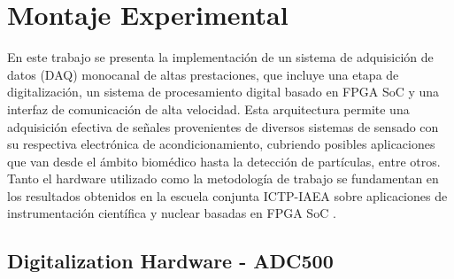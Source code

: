 \documentclass[]{book}
\begin{document}



\section{Montaje Experimental}

\noindent En este trabajo se presenta la implementación de un sistema de adquisición de datos (DAQ) monocanal de altas prestaciones, que incluye una etapa de digitalización, un sistema de procesamiento digital basado en FPGA SoC y una interfaz de comunicación de alta velocidad. Esta arquitectura permite una adquisición efectiva de señales provenientes de diversos sistemas de sensado con su respectiva electrónica de acondicionamiento, cubriendo posibles aplicaciones que van desde el ámbito biomédico hasta la detección de partículas, entre otros. Tanto el hardware utilizado como la metodología de trabajo se fundamentan en los resultados obtenidos en la escuela conjunta ICTP-IAEA sobre aplicaciones de instrumentación científica y nuclear basadas en FPGA SoC \cite{ictp_smr3765}.

\subsection{Digitalization Hardware - ADC500}
\end{document}
